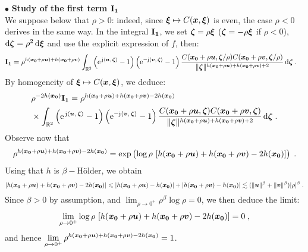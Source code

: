 \documentclass{elsarticle}
\begin{document}
\noindent $\bullet$ \textbf{Study of the first term $\mathbf{I_1}$}\\

\noindent
We suppose below that $\rho >0$: indeed, since $\bm{\xi}\mapsto C(\bm{x},\bm{\xi})$ is even, the case $\rho<0$ derives in the same way.  
 In the integral $\mathbf{I_1}$, we set $\bm{\zeta}=\rho\bm{\xi}$ ($\bm{\zeta}=-\rho\bm{\xi}$ if $\rho <0$), $\dif \vect{\zeta}=\rho^2\dif \vect{\xi}$ and use the explicit expression of $f$, then:
\begin{align*}
&\mat{I_1}=\rho^{h(\vect{x_0}+\rho \vect{u})+h(\vect{x_0}+\rho \vect{v})}\int_{\mathbb{R}^2}\left(\expj{\ip{\vect{u}}{\vect{\zeta}}}-1\right)\left(\eu^{-\jj \ip{\vect{v}}{\vect{\zeta}}}-1\right)\frac{C(\vect{x_0}+\rho \vect{u},\vect{\zeta}/\rho)C(\vect{x_0}+\rho \vect{v},\vect{\zeta}/\rho)}{\lVert \vect{\zeta} \rVert^{h(\vect{x_0}+\rho \vect{u})+h(\vect{x_0}+\rho \vect{v})+2}}\dif \vect{\zeta}\;.
\end{align*}
By homogeneity of $\bm{\xi}\mapsto C(\bm{x},\bm{\xi})$, we deduce:
\begin{align*}
&\rho^{-2h(\vect{x_0})}\mat{I_1}=\rho^{h(\vect{x_0}+\rho \vect{u})+h(\vect{x_0}+\rho \vect{v})-2h(\vect{x_0})}\\
&\times \int_{\mathbb{R}^2}\left(\expj{\ip{\vect{u}}{\vect{\zeta}}}-1\right)\left(\eu^{-\jj \ip{\vect{v}}{\vect{\zeta}}}-1\right)\frac{C(\vect{x_0}+\rho \vect{u},\vect{\zeta})C(\vect{x_0}+\rho \vect{v},\vect{\zeta})}{\lVert \vect{\zeta} \rVert^{h(\vect{x_0}+\rho \vect{u})+h(\vect{x_0}+\rho \vect{v})+2}}\dif \vect{\zeta}\;.
\end{align*}
Observe now that
\begin{equation*}
\rho^{h(\bm{x_0}+\rho \bm{u})+h(\bm{x_0}+\rho \bm{v})-2h(\bm{x_0})}=\exp\left({\log\rho~ [h(\bm{x_0}+\rho \bm{u})+h(\bm{x_0}+\rho \bm{v})-2h(\bm{x_0})]}\right)\;.
\end{equation*}
Using that $h$ is $\beta-$H\"{o}lder, we obtain
\begin{equation*}
|h(\bm{x_0}+\rho \bm{u})+h(\bm{x_0}+\rho \bm{v})-2h(\bm{x_0})|\leqslant |h(\bm{x_0}+\rho \bm{u})-h(\bm{x_0})|+|h(\bm{x_0}+\rho \bm{v})-h(\bm{x_0})|\lesssim (\lVert \bm{u}\rVert^\beta+\lVert\bm{v}\rVert^\beta)|\rho|^\beta\;.
\end{equation*}
Since $\beta>0$ by assumption, and $\displaystyle \lim_{\rho\to 0^+}\rho^\beta \log\rho=0$, we then deduce the limit:
\begin{equation}\label{eq:lim_rho}
\lim_{\rho\to 0^+}\log\rho~[h(\bm{x_0}+\rho \bm{u})+h(\bm{x_0}+\rho \bm{v})-2h(\bm{x_0})]=0\;,
\end{equation}
and hence $\displaystyle \lim_{\rho\to 0^+}\rho^{h(\bm{x_0}+\rho \bm{u})+h(\bm{x_0}+\rho \bm{v})-2h(\bm{x_0})}=1$.
\end{document}
